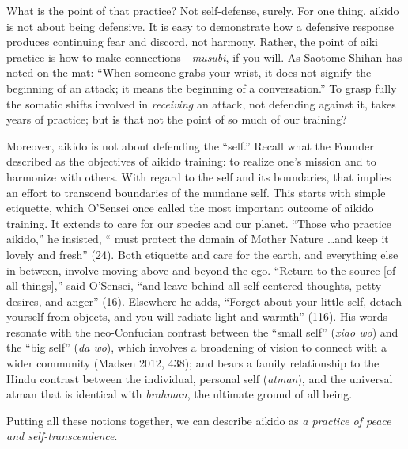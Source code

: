 What is the point of that practice? Not self-defense, surely. For one thing, aikido is not about being defensive. It is easy to demonstrate how a defensive response produces continuing fear and discord, not harmony. Rather, the point of aiki practice is how to make connections---\emph{musubi}, if you will. As Saotome Shihan has noted on the mat: ``When someone grabs your wrist, it does not signify the beginning of an attack; it means the beginning of a conversation.'' To grasp fully the somatic shifts involved in \emph{receiving} an attack, not defending against it, takes years of practice; but is that not the point of so much of our training?

Moreover, aikido is not about defending the ``self.'' Recall what the Founder described as the objectives of aikido training: to realize one's mission and to harmonize with others. With regard to the self and its boundaries, that implies an effort to transcend boundaries of the mundane self. This starts with simple etiquette, which O'Sensei once called the most important outcome of aikido training. It extends to care for our species and our planet. ``Those who practice aikido,'' he insisted, `` must protect the domain of Mother Nature \ldots{}and keep it lovely and fresh'' (24). Both etiquette and care for the earth, and everything else in between, involve moving above and beyond the ego. ``Return to the source [of all things],'' said O'Sensei, ``and leave behind all self-centered thoughts, petty desires, and anger'' (16). Elsewhere he adds, ``Forget about your little self, detach yourself from objects, and you will radiate light and warmth'' (116). His words resonate with the neo-Confucian contrast between the ``small self'' (\emph{xiao wo}) and the ``big self'' (\emph{da wo}), which involves a broadening of vision to connect with a wider community (Madsen 2012, 438); and bears a family relationship to the Hindu contrast between the individual, personal self (\emph{atman}), and the universal atman that is identical with \emph{brahman}, the ultimate ground of all being.

Putting all these notions together, we can describe aikido as \emph{a practice of peace and self-transcendence}. 

